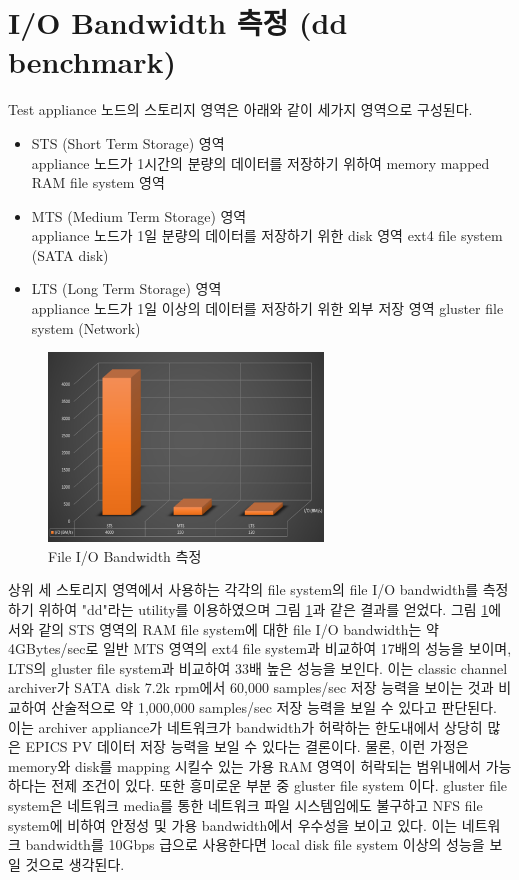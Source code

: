 \documentclass[11pt
  , a4paper
  , article
  , oneside
]{memoir}
\begin{document}
\section{I/O Bandwidth 측정 (dd benchmark)}
Test appliance 노드의 스토리지 영역은 아래와 같이 세가지 영역으로 구성된다.

\begin{itemize}
	\item STS (Short Term Storage) 영역\\
	appliance 노드가 1시간의 분량의 데이터를 저장하기 위하여 memory mapped RAM file system 영역
	\item MTS (Medium Term Storage) 영역 \\
	appliance 노드가 1일 분량의 데이터를 저장하기 위한 disk 영역 ext4 file system (SATA disk)
	\item LTS (Long Term Storage) 영역 \\
	appliance 노드가 1일 이상의 데이터를 저장하기 위한 외부 저장 영역 gluster file system (Network)
\end{itemize}

\begin{figure}[h!]
	\centering
	\includegraphics[width=0.65\textwidth]{./images/image-1.eps}
	\caption{File I/O Bandwidth 측정}
	\label{fig:file_bandwidth} 
\end{figure}

상위 세 스토리지 영역에서 사용하는 각각의 file system의 file I/O bandwidth를 측정하기 위하여 "dd"라는 utility를 이용하였으며 그림 \ref{fig:file_bandwidth}과 같은 결과를 얻었다. 그림 \ref{fig:file_bandwidth}에서와 같의 STS 영역의 RAM file system에 대한 file I/O bandwidth는 약 4GBytes/sec로 일반 MTS 영역의 ext4 file system과 비교하여 17배의 성능을 보이며, LTS의 gluster file system과 비교하여 33배 높은 성능을 보인다. 이는 classic channel archiver가 SATA disk 7.2k rpm에서 60,000 samples/sec 저장 능력을 보이는 것과 비교하여 산술적으로 약 1,000,000 samples/sec 저장 능력을 보일 수 있다고 판단된다. 이는 archiver appliance가 네트워크가 bandwidth가 허락하는 한도내에서 상당히 많은 EPICS PV 데이터 저장 능력을 보일 수 있다는 결론이다. 물론, 이런 가정은 memory와 disk를 mapping 시킬수 있는 가용 RAM 영역이 허락되는 범위내에서 가능하다는 전제 조건이 있다. 또한 흥미로운 부분 중 gluster file system 이다. gluster file system은 네트워크 media를 통한 네트워크 파일 시스템임에도 불구하고 NFS file system에 비하여 안정성 및 가용 bandwidth에서 우수성을 보이고 있다. 이는 네트워크 bandwidth를 10Gbps 급으로 사용한다면 local disk file system 이상의 성능을 보일 것으로 생각된다.
\end{document}
